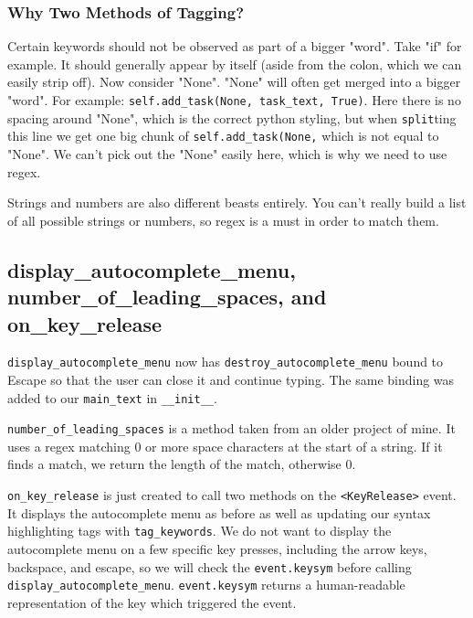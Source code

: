 \documentclass[a4paper,11pt,openany]{book}
\begin{document}
\subsubsection{Why Two Methods of Tagging?}

Certain keywords should not be observed as part of a bigger "word". Take "if" for example. It should generally appear by itself (aside from the colon, which we can easily strip off). Now consider "None". "None" will often get merged into a bigger "word". For example: \lstinline[columns=fixed]{self.add_task(None, task_text, True)}. Here there is no spacing around "None", which is the correct python styling, but when \lstinline[columns=fixed]{split}ting this line we get one big chunk of \lstinline[columns=fixed]{self.add_task(None,} which is not equal to "None". We can't pick out the "None" easily here, which is why we need to use regex. 

\vspace{5mm}

Strings and numbers are also different beasts entirely. You can't really build a list of all possible strings or numbers, so regex is a must in order to match them. 

\subsection{display\_autocomplete\_menu, number\_of\_leading\_spaces, and on\_key\_release}

\lstinline[columns=fixed]{display_autocomplete_menu} now has \lstinline[columns=fixed]{destroy_autocomplete_menu} bound to Escape so that the user can close it and continue typing. The same binding was added to our \lstinline[columns=fixed]{main_text} in \lstinline[columns=fixed]{__init__}. 

\lstinline[columns=fixed]{number_of_leading_spaces} is a method taken from an older project of mine. It uses a regex matching 0 or more space characters at the start of a string. If it finds a match, we return the length of the match, otherwise 0.

\vspace{5mm}

\lstinline[columns=fixed]{on_key_release} is just created to call two methods on the \lstinline[columns=fixed]{<KeyRelease>} event. It displays the autocomplete menu as before as well as updating our syntax highlighting tags with \lstinline[columns=fixed]{tag_keywords}. We do not want to display the autocomplete menu on a few specific key presses, including the arrow keys, backspace, and escape, so we will check the \lstinline[columns=fixed]{event.keysym} before calling \lstinline[columns=fixed]{display_autocomplete_menu}. \lstinline[columns=fixed]{event.keysym} returns a human-readable representation of the key which triggered the event. 
\end{document}
